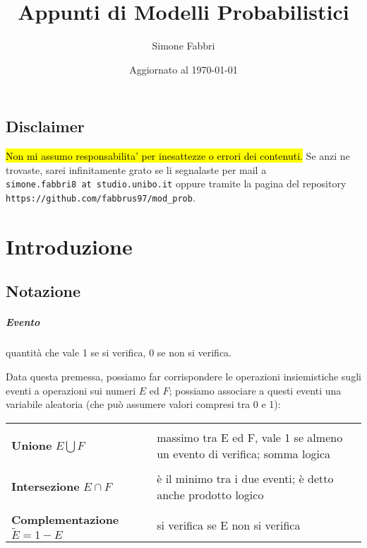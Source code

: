 \documentclass[a4paper,12pt]{book}
\begin{document}
	
\newcommand{\formule}[2]{
	\par\medskip\noindent%
	\begin{tabular*}{\linewidth}{@{}
			>{\centering$\displaystyle}p{\dimexpr0.24\linewidth-2\tabcolsep}<{$} %
			m{\dimexpr0.56\linewidth-2\tabcolsep}
			@{}}
		#1 & #2  
	\end{tabular*}\par\medskip\noindent}


\author{Simone Fabbri}
\title{Appunti di Modelli Probabilistici}
\date{Aggiornato al \today}

\frontmatter
\maketitle

\section*{Disclaimer}
\hl{Non mi assumo responsabilita' per inesattezze o errori dei contenuti.} Se anzi ne trovaste, sarei infinitamente grato se li segnalaste per mail a \\ \texttt{simone.fabbri8 at studio.unibo.it} oppure tramite la pagina del repository \texttt{https://github.com/fabbrus97/mod\_prob}. 

\tableofcontents

\mainmatter
%
%
\chapter{Introduzione}
\section{Notazione}
\paragraph{Evento} quantità che vale 1 se si verifica, 0 se non si verifica. 

Data questa premessa, possiamo far corrispondere le operazioni insiemistiche sugli eventi a operazioni sui numeri $ E $ ed $ F $; possiamo associare a questi eventi una variabile aleatoria (che può assumere valori compresi tra 0 e 1):

\begin{center}
	\begin{tabular}{ p{4cm}|p{9cm} }	
		\hline
		\\
		\textbf{Unione} $ E \bigcup F $ & massimo tra E ed F, vale 1 se almeno un evento di verifica; somma logica \\
		\hline
		\\
		\textbf{Intersezione} $ E \cap F $ & è il minimo tra i due eventi; è detto anche prodotto logico \\
		\hline
		\\
		\textbf{Complementazione} $\widetilde{E} = 1 - E$ & si verifica se E non si verifica \\
		\hline
	\end{tabular}
\end{center}
\end{document}
